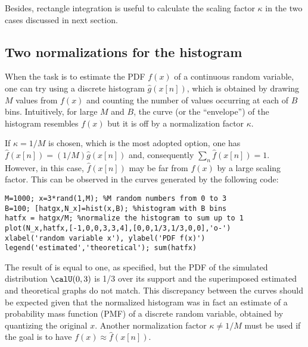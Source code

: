 Besides, rectangle integration is 
useful to calculate the scaling factor $\kappa$ in the two cases discussed in next section.

\subsection{Two normalizations for the histogram}

When the task is to estimate the PDF $f(x)$ of a continuous random variable, one can try using a discrete histogram $\hat g(x[n])$, which is obtained by drawing $M$ values from $f(x)$ and counting the number of values occurring at each of $B$ bins. Intuitively, for large $M$ and $B$, the curve (or the ``envelope'') of the histogram resembles $f(x)$ but it is off by a normalization factor $\kappa$.

If $\kappa = 1/M$ is chosen, which is the most adopted option, one has $\hat f(x[n])=(1/M) \hat g(x[n])$ and, consequently $\sum_n \hat f(x[n]) = 1$. However, in this case, $\hat f(x[n])$ may be far from $f(x)$ by a large scaling factor. This can be observed in the curves generated by the following code:
\begin{lstlisting}
M=1000; x=3*rand(1,M); %M random numbers from 0 to 3
B=100; [hatgx,N_x]=hist(x,B); %histogram with B bins
hatfx = hatgx/M; %normalize the histogram to sum up to 1
plot(N_x,hatfx,[-1,0,0,3,3,4],[0,0,1/3,1/3,0,0],'o-')
xlabel('random variable x'), ylabel('PDF f(x)')
legend('estimated','theoretical'); sum(hatfx)
\end{lstlisting}
The result of  is equal to one, as specified, but the PDF of the simulated distribution $\calU(0,3)$ is 1/3 over its support and the superimposed estimated and theoretical graphs do not match. 
This discrepancy between the curves should be expected given that the normalized histogram  was in fact an estimate of a probability mass function (PMF) of a discrete random variable, obtained by quantizing the original $x$.
Another normalization factor $\kappa \ne 1/M$ must be used if the goal is to have $f(x) \approx \hat f(x[n])$.

